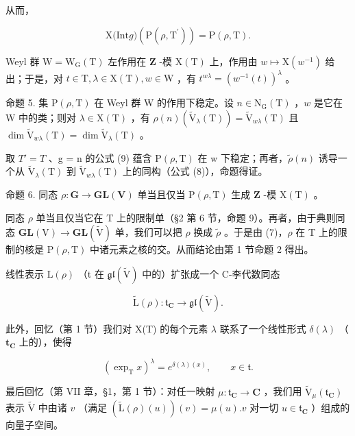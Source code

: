 从而，

\[
\mathrm{X(Int} g) (\mathrm{P} (\rho , \mathrm{T} ^ {\prime})) = \mathrm{P} (\rho , \mathrm{T}).\tag{9}
\]

Weyl 群 \(\mathrm{W} = \mathrm{W}_{\mathrm{G}}(\mathrm{T})\) 左作用在 \(\mathbf{Z}\) -模 \(\mathrm{X(T)}\) 上，作用由 \(w\mapsto \mathrm{X}(w^{-1})\) 给出；于是，对 \(t\in \mathrm{T},\lambda \in \mathrm{X(T)},w\in \mathrm{W}\) ，有 \(t^{w\lambda} = (w^{-1}(t))^{\lambda}\) 。

命题 5. 集 \(\mathrm{P}(\rho, \mathrm{T})\) 在 Weyl 群 W 的作用下稳定。设 \(n \in \mathrm{N}_{\mathrm{G}}(\mathrm{T})\) ，\(w\) 是它在 W 中的类；则对 \(\lambda \in \mathrm{X}(\mathrm{T})\) ，有 \(\rho(n)(\tilde{\mathrm{V}}_{\lambda}(\mathrm{T})) = \tilde{\mathrm{V}}_{w\lambda}(\mathrm{T})\) 且 \(\dim \tilde{\mathrm{V}}_{w\lambda}(\mathrm{T}) = \dim \tilde{\mathrm{V}}_{\lambda}(\mathrm{T})\) 。

取 \(T' = T\) 、g = n 的公式 (9) 蕴含 \(\mathrm{P}(\rho, \mathrm{T})\) 在 w 下稳定；再者，\(\tilde{\rho}(n)\) 诱导一个从 \(\tilde{\mathrm{V}}_{\lambda}(\mathrm{T})\) 到 \(\tilde{\mathrm{V}}_{w\lambda}(\mathrm{T})\) 上的同构（公式 (8)），命题得证。

命题 6. 同态 \(\rho : \mathbf{G} \to \mathbf{GL}(\mathbf{V})\) 单当且仅当 \(\mathrm{P}(\rho, \mathrm{T})\) 生成 \(\mathbf{Z}\) -模 \(\mathrm{X}(\mathrm{T})\) 。

同态 \(\rho\) 单当且仅当它在 T 上的限制单（§2 第 6 节，命题 9）。再者，由于典则同态 \(\mathbf{GL}(\mathrm{V}) \to \mathbf{GL}(\tilde{\mathrm{V}})\) 单，我们可以把 \(\rho\) 换成 \(\tilde{\rho}\) 。于是由 (7)，\(\rho\) 在 T 上的限制的核是 \(\mathrm{P}(\rho, \mathrm{T})\) 中诸元素之核的交。从而结论由第 1 节命题 2 得出。

线性表示 \(\mathrm{L}(\rho)\) （t 在 \(\mathfrak{gl}(\tilde{\mathrm{V}})\) 中的）扩张成一个 C-李代数同态

\[
\tilde {\mathrm{L}} (\rho): \mathfrak {t} _ {\mathbf {C}} \to \mathfrak {g l} (\tilde {\mathrm{V}}).
\]

此外，回忆（第 1 节）我们对 X(T) 的每个元素 \(\lambda\) 联系了一个线性形式 \(\delta (\lambda)\) （\(\mathbf{t}_{\mathbf{C}}\) 上的），使得

\[
(\exp_ {\mathrm{T}} x) ^ {\lambda} = e ^ {\delta (\lambda) (x)}, \qquad x \in \mathfrak {t}.\tag{10}
\]

最后回忆（第 VII 章，§1，第 1 节）：对任一映射 \(\mu : \mathfrak{t}_{\mathbf{C}} \to \mathbf{C}\) ，我们用 \(\tilde{\mathrm{V}}_{\mu}(\mathfrak{t}_{\mathbf{C}})\) 表示 \(\tilde{\mathrm{V}}\) 中由诸 \(v\) （满足 \((\tilde{\mathrm{L}}(\rho)(u))(v) = \mu(u).v\) 对一切 \(u \in \mathfrak{t}_{\mathbf{C}}\) ）组成的向量子空间。

